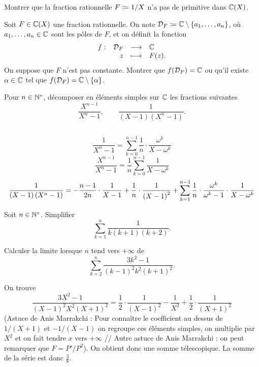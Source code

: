 \documentclass{magnolia}
\begin{document}

Montrer que la fraction rationnelle $F\coloneqq 1/X$ n'a pas de primitive dans $\fracC$.


Soit $F\in\fracC$ une fraction rationnelle. On note $\mathcal{D}_F\coloneqq\mathbb{C}\setminus\left\{a_1,\ldots,a_n\right\}$,
où $a_1,\ldots,a_n\in\mathbb{C}$ sont les pôles de $F$, et on définit la fonction
\[\begin{array}[t]{lrcl} \displaystyle{f} : & \displaystyle{\mathcal{D}_F} & \longrightarrow & \displaystyle{\mathbb{C}} \\ & \displaystyle{z} & \longmapsto & \displaystyle{F(z).} \end{array}\]
On suppose que $F$ n'est pas constante. Montrer que $f(\mathcal{D}_F)=\mathbb{C}$ ou qu'il existe $\alpha\in\mathbb{C}$
tel que $f(\mathcal{D}_F)=\mathbb{C}\setminus\left\{\alpha\right\}$.




Pour $n\in{\mathbb{N}^*}$, décomposer en éléments simples sur $\mathbb{C}$ les fractions suivantes
\[\frac{X^{n-1}}{X^n-1}, \qquad
  \frac{1}{(X-1)(X^n-1)}.\]
\begin{sol}
$\quad$
\begin{questions}
\question 
  \[\frac{1}{X^n-1}=\sum_{k=0}^{n-1} \frac{1}{n}\cdot\frac{\omega^k}{X-\omega^k}\]
\question 
  \[\frac{X^{n-1}}{X^n-1}=\frac{1}{n}\sum_{k=0}^{n-1} \frac{1}{X-\omega^k}\]
\question 
  \[\frac{1}{\left(X-1\right)\left(X^n-1\right)}=-\frac{n-1}{2n}\cdot\frac{1}{X-1}+
    \frac{1}{n}\cdot\frac{1}{\left(X-1\right)^2}+\sum_{k=1}^{n-1}
    \frac{1}{n}\cdot\frac{\omega^k}{\omega^k-1}\cdot\frac{1}{X-\omega^k}\]
\end{questions}
\end{sol}

Soit $n\in{\mathbb{N}^*}$. Simplifier
\[\sum_{k=1}^n \frac{1}{k(k+1)(k+2)}.\]

Calculer la limite lorsque $n$ tend vers $+\infty$ de
\[\sum_{k=2}^n \frac{3k^2-1}{(k-1)^2k^2(k+1)^2}.\]
\begin{sol}
On trouve
\[\frac{3X^2-1}{(X-1)^2X^2(X+1)^2}=\frac{1}{2}\cdot\frac{1}{(X-1)^2}
  -\frac{1}{X^2}+\frac{1}{2}\cdot\frac{1}{(X+1)^2}\]
(Astuce de Anis Marrakchi : Pour connaître le coefficient au dessus de
$1/(X+1)$ et $-1/(X-1)$ on regroupe ces éléments simples, on multiplie par
$X^2$ et on fait tendre $x$ vers $+\infty$ // Autre astuce de Anis Marrakchi :
on peut remarquer que $F=P'/P^2$).
On obtient donc une somme télescopique. La somme de la série est donc
$\frac{3}{8}$.
\end{sol}
\end{document}
